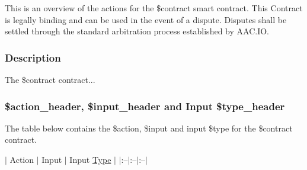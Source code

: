 This is an overview of the actions for the {\ttfamily \$contract} smart contract. This Contract is legally binding and can be used in the event of a dispute. Disputes shall be settled through the standard arbitration process established by A\+A\+C.\+IO.

\subsubsection*{Description}

The {\ttfamily \$contract} contract...

\subsubsection*{\$action\+\_\+header, \$input\+\_\+header and Input \$type\+\_\+header}

The table below contains the {\ttfamily \$action}, {\ttfamily \$input} and {\ttfamily input \$type} for the {\ttfamily \$contract} contract.

$\vert$ Action $\vert$ Input $\vert$ Input \mbox{\hyperlink{struct_type}{Type}} $\vert$ $\vert$\+:--$\vert$\+:--$\vert$\+:--$\vert$ 